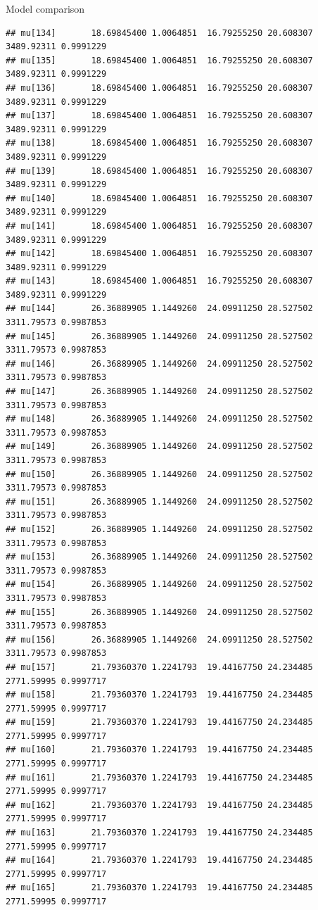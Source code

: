 \documentclass[
  ignorenonframetext,
]{beamer}
\begin{document}
\begin{frame}[fragile]{Model comparison}
\begin{verbatim}
## mu[134]       18.69845400 1.0064851  16.79255250 20.608307 3489.92311 0.9991229
## mu[135]       18.69845400 1.0064851  16.79255250 20.608307 3489.92311 0.9991229
## mu[136]       18.69845400 1.0064851  16.79255250 20.608307 3489.92311 0.9991229
## mu[137]       18.69845400 1.0064851  16.79255250 20.608307 3489.92311 0.9991229
## mu[138]       18.69845400 1.0064851  16.79255250 20.608307 3489.92311 0.9991229
## mu[139]       18.69845400 1.0064851  16.79255250 20.608307 3489.92311 0.9991229
## mu[140]       18.69845400 1.0064851  16.79255250 20.608307 3489.92311 0.9991229
## mu[141]       18.69845400 1.0064851  16.79255250 20.608307 3489.92311 0.9991229
## mu[142]       18.69845400 1.0064851  16.79255250 20.608307 3489.92311 0.9991229
## mu[143]       18.69845400 1.0064851  16.79255250 20.608307 3489.92311 0.9991229
## mu[144]       26.36889905 1.1449260  24.09911250 28.527502 3311.79573 0.9987853
## mu[145]       26.36889905 1.1449260  24.09911250 28.527502 3311.79573 0.9987853
## mu[146]       26.36889905 1.1449260  24.09911250 28.527502 3311.79573 0.9987853
## mu[147]       26.36889905 1.1449260  24.09911250 28.527502 3311.79573 0.9987853
## mu[148]       26.36889905 1.1449260  24.09911250 28.527502 3311.79573 0.9987853
## mu[149]       26.36889905 1.1449260  24.09911250 28.527502 3311.79573 0.9987853
## mu[150]       26.36889905 1.1449260  24.09911250 28.527502 3311.79573 0.9987853
## mu[151]       26.36889905 1.1449260  24.09911250 28.527502 3311.79573 0.9987853
## mu[152]       26.36889905 1.1449260  24.09911250 28.527502 3311.79573 0.9987853
## mu[153]       26.36889905 1.1449260  24.09911250 28.527502 3311.79573 0.9987853
## mu[154]       26.36889905 1.1449260  24.09911250 28.527502 3311.79573 0.9987853
## mu[155]       26.36889905 1.1449260  24.09911250 28.527502 3311.79573 0.9987853
## mu[156]       26.36889905 1.1449260  24.09911250 28.527502 3311.79573 0.9987853
## mu[157]       21.79360370 1.2241793  19.44167750 24.234485 2771.59995 0.9997717
## mu[158]       21.79360370 1.2241793  19.44167750 24.234485 2771.59995 0.9997717
## mu[159]       21.79360370 1.2241793  19.44167750 24.234485 2771.59995 0.9997717
## mu[160]       21.79360370 1.2241793  19.44167750 24.234485 2771.59995 0.9997717
## mu[161]       21.79360370 1.2241793  19.44167750 24.234485 2771.59995 0.9997717
## mu[162]       21.79360370 1.2241793  19.44167750 24.234485 2771.59995 0.9997717
## mu[163]       21.79360370 1.2241793  19.44167750 24.234485 2771.59995 0.9997717
## mu[164]       21.79360370 1.2241793  19.44167750 24.234485 2771.59995 0.9997717
## mu[165]       21.79360370 1.2241793  19.44167750 24.234485 2771.59995 0.9997717

\end{verbatim}
\end{frame}
\end{document}
